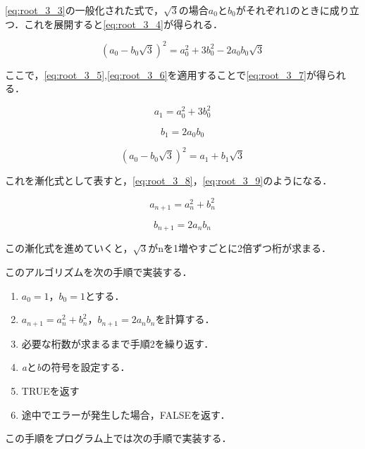 \documentclass[a4paper,11pt,dvipdfmx]{jsarticle}
\begin{document}
\eqref{eq:root_3_3}の一般化された式で，$\sqrt{3}$の場合$a_0$と$b_0$がそれぞれ1のときに成り立つ．これを展開すると\eqref{eq:root_3_4}が得られる．

\begin{equation}
    (a_0 - b_0\sqrt{3}) ^ 2 = a_0^2 +3b_0^2 - 2a_0b_0\sqrt{3}
    \label{eq:root_3_4}
\end{equation}

ここで，\eqref{eq:root_3_5},\eqref{eq:root_3_6}を適用することで\eqref{eq:root_3_7}が得られる．

\begin{equation}
    a_1 = a_0^2 + 3b_0^2
    \label{eq:root_3_5}
\end{equation}

\begin{equation}
    b_1 = 2a_0b_0
    \label{eq:root_3_6}
\end{equation}

\begin{equation}
    (a_0 - b_0\sqrt{3}) ^ 2 = a_1 + b_1\sqrt{3}
    \label{eq:root_3_7}
\end{equation}

これを漸化式として表すと，\eqref{eq:root_3_8}，\eqref{eq:root_3_9}のようになる．

\begin{equation}
    a_{n+1} = a_n^2 + b_n^2
    \label{eq:root_3_8}
\end{equation}

\begin{equation}
    b_{n+1} = 2a_nb_n
    \label{eq:root_3_9}
\end{equation}

この漸化式を進めていくと，$\sqrt{3}$がnを1増やすごとに2倍ずつ桁が求まる．

このアルゴリズムを次の手順で実装する．

\begin{enumerate}
    \item $a_0 = 1$，$b_0 = 1$とする．
    \item $a_{n+1} = a_n^2 + b_n^2$，$b_{n+1} = 2a_nb_n$を計算する．
    \item 必要な桁数が求まるまで手順2を繰り返す．
    \item \textit{a}と\textit{b}の符号を設定する．
    \item TRUEを返す
    \item 途中でエラーが発生した場合，FALSEを返す．
\end{enumerate}

この手順をプログラム上では次の手順で実装する．
\end{document}
